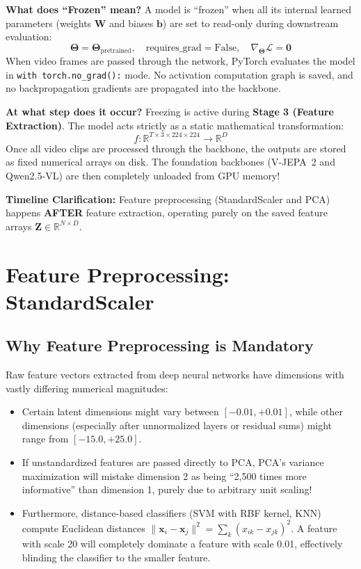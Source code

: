 \documentclass[11pt, a4paper]{article}
\begin{document}
\begin{defensebox}
\textbf{What does ``Frozen'' mean?}
A model is ``frozen'' when all its internal learned parameters (weights $\mathbf{W}$ and biases $\mathbf{b}$) are set to read-only during downstream evaluation:
$$\mathbf{\Theta} = \mathbf{\Theta}_{\text{pretrained}}, \quad \text{requires\_grad} = \text{False}, \quad \nabla_{\mathbf{\Theta}} \mathcal{L} = \mathbf{0}$$
When video frames are passed through the network, PyTorch evaluates the model in \texttt{with torch.no\_grad():} mode. No activation computation graph is saved, and no backpropagation gradients are propagated into the backbone.

\textbf{At what step does it occur?}
Freezing is active during \textbf{Stage 3 (Feature Extraction)}. The model acts strictly as a static mathematical transformation:
$$f: \mathbb{R}^{T \times 3 \times 224 \times 224} \longrightarrow \mathbb{R}^D$$
Once all video clips are processed through the backbone, the outputs are stored as fixed numerical arrays on disk. The foundation backbones (V-JEPA~2 and Qwen2.5-VL) are then completely unloaded from GPU memory!

\textbf{Timeline Clarification:}
Feature preprocessing (StandardScaler and PCA) happens \textbf{AFTER} feature extraction, operating purely on the saved feature arrays $\mathbf{Z} \in \mathbb{R}^{N \times D}$.
\end{defensebox}

\clearpage

\section{Feature Preprocessing: StandardScaler}

\subsection{Why Feature Preprocessing is Mandatory}

Raw feature vectors extracted from deep neural networks have dimensions with vastly differing numerical magnitudes:
\begin{itemize}[leftmargin=1.2em]
    \item Certain latent dimensions might vary between $[-0.01, +0.01]$, while other dimensions (especially after unnormalized layers or residual sums) might range from $[-15.0, +25.0]$.
    \item If unstandardized features are passed directly to PCA, PCA's variance maximization will mistake dimension 2 as being ``2,500 times more informative'' than dimension 1, purely due to arbitrary unit scaling!
    \item Furthermore, distance-based classifiers (SVM with RBF kernel, KNN) compute Euclidean distances $\|\mathbf{x}_i - \mathbf{x}_j\|^2 = \sum_k (x_{ik} - x_{jk})^2$. A feature with scale 20 will completely dominate a feature with scale 0.01, effectively blinding the classifier to the smaller feature.
\end{itemize}
\end{document}
